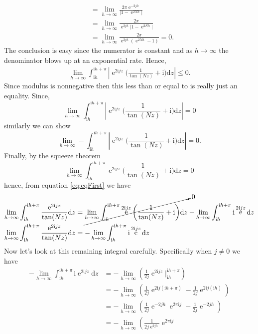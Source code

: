 \documentclass[10pt]{amsart}
\newcommand{\D}{\mathrm{d}}
\newcommand{\I}{\mathrm{i}}
\DeclareMathOperator{\E}{e}
\theoremstyle{nonumberplain}
\begin{document}
\begin{enumerate}[label={\bf {\arabic*}:}]
\begin{align*}
&= \lim_{h \to \infty} \frac{ 2 \pi \E^{- 2 j h} }{| 1 - \E^{ 2 N h} |} \\
&= \lim_{h \to \infty} \frac{ 2 \pi }{\E^{ 2 j h}| 1 - \E^{ 2 N h} |} \\
&= \lim_{h \to \infty} \frac{ 2 \pi }{\E^{ 2 j h}( \E^{ 2 N h}  - 1)} = 0.
\end{align*}
The conclusion is easy since the numerator is constant and as $h \rightarrow \infty$ the denominator blows up at an exponential rate.
Hence,
\begin{align*}
\lim_{h \to \infty} \int_{\I h}^{\I h + \pi} \left| \E^{2 \I jz} \bigg( \frac 1 {\tan (N z)} + \I \bigg) \D z \right| \leq 0.
\end{align*}
Since modulus is nonnegative then this less than or equal to is really just an equality.
Since,
$$\lim_{h \to \infty} \int_{\I h}^{\I h + \pi} \left| \E^{2 \I jz} \bigg( \frac 1 {\tan (N z)} + \I \bigg) \D z \right| = 0 $$
similarly we can show
$$
\lim_{h \to \infty} - \int_{\I h}^{\I h + \pi} \left| \E^{2 \I jz} \bigg( \frac 1 {\tan (N z)} + \I \bigg) \D z \right| = 0.
$$
Finally, by the squeeze theorem
$$
\lim_{h \to \infty} \int_{\I h}^{\I h + \pi} \E^{2 \I jz} \bigg( \frac 1 {\tan (N z)} + \I \bigg) \D z  = 0
$$
hence, from equation \eqref{eq:eqFirst} we have
\begin{align*}
\lim_{h \to \infty} \int_{\I h}^{\I h + \pi} \frac{\E^{2 \I jz}}{\tan (N z)} \D z
	&= \cancelto{0}{\lim_{h \to \infty} \int_{\I h}^{\I h + \pi} \E^{2 \I jz} \bigg( \frac 1 {\tan (N z)}  + \I \bigg) \D z} - \lim_{h \to \infty} \int_{\I h}^{\I h + \pi} \I \E^{2 \I jz}   \D z \\
\lim_{h \to \infty} \int_{\I h}^{\I h + \pi} \frac{\E^{2 \I jz}}{\tan (N z)} \D z
	&= - \lim_{h \to \infty} \int_{\I h}^{\I h + \pi} \I \E^{2 \I jz}   \D z
\end{align*}
Now let's look at this remaining integral carefully.
Specifically when $j \neq 0$ we have
\begin{align*}
- \lim_{h \to \infty} \int_{\I h}^{\I h + \pi} \I \E^{2 \I jz} \D z
	&= - \lim_{h \to \infty} \left( \frac 1 {2 j } \E^{2 \I jz} \bigg|_{\I h}^{\I h + \pi}  \right) \\
	&= - \lim_{h \to \infty} \left( \frac 1 {2 j } \E^{2 \I j(\I h + \pi)} - \frac 1 {2 j } \E^{2 \I j(\I h)}  \right) \\
	&= - \lim_{h \to \infty} \left( \frac 1 {2 j } \E^{- 2 j h}\E^{2 \pi \I j}
		- \frac 1 {2 j } \E^{- 2 j h}  \right) \\
	&= - \lim_{h \to \infty} \left( \frac 1 {2 j \E^{2 j h}} \E^{2 \pi \I j}

\end{align*}
\end{enumerate}
\end{document}
